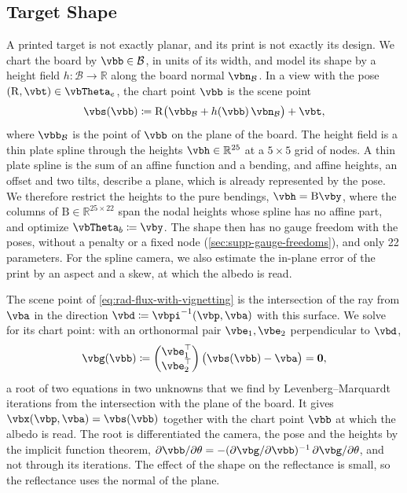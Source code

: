 \subsection{Target Shape}
\label{sec:target-shape}
A printed target is not exactly planar, and its print is not exactly
its design. We chart the board by $\vbb\in\mathcal{B}$, in units of
its width, and model its shape by a height field
$h:\mathcal{B}\rightarrow\mathbb{R}$ along the board normal
$\vbn_{\mathcal{B}}$. In a view with the pose
$(\mathrm{R},\vbt)\in\vbTheta_e$, the chart point $\vbb$ is the scene
point
\begin{equation}
\label{eq:board-surface}
    \vbs(\vbb) \coloneqq \mathrm{R}\bigl(\vbb_{\mathcal{B}} + h(\vbb)\,\vbn_{\mathcal{B}}\bigr) + \vbt,
\end{equation}
where $\vbb_{\mathcal{B}}$ is the point of $\vbb$ on the plane of the
board. The height field is a thin plate spline
\cite{thin-plate-spline} through the heights
$\vbh\in\mathbb{R}^{25}$ at a $5\times5$ grid of nodes. A thin plate
spline is the sum of an affine function and a bending, and affine
heights, an offset and two tilts, describe a plane, which is already
represented by the pose. We therefore restrict the heights to the
pure bendings, $\vbh=\mathrm{B}\vby$, where the columns of
$\mathrm{B}\in\mathbb{R}^{25\times22}$ span the nodal heights whose
spline has no affine part, and optimize $\vbTheta_b\coloneqq\vby$.
The shape then has no gauge freedom with the poses, without a
penalty or a fixed node (\cref{sec:supp-gauge-freedoms}), and only
22 parameters. For the spline camera, we also estimate the in-plane error of the print by
an aspect and a skew, at which the albedo is read.

The scene point of \cref{eq:rad-flux-with-vignetting} is the
intersection of the ray from $\vba$ in the direction
$\vbd\coloneqq\vbpi^{-1}(\vbp,\vba)$ with this surface. We solve for
its chart point: with an orthonormal pair $\vbe_1,\vbe_2$
perpendicular to $\vbd$,
\begin{equation}
\label{eq:board-intersection}
    \vbg(\vbb) \coloneqq
    \begin{pmatrix}\vbe_1^\top\\ \vbe_2^\top\end{pmatrix}
    \bigl(\vbs(\vbb)-\vba\bigr) = \mathbf{0},
\end{equation}
a root of two equations in two unknowns that we find by
Levenberg--Marquardt iterations from the intersection with the plane
of the board. It gives $\vbx(\vbp,\vba)=\vbs(\vbb)$ together with the
chart point $\vbb$ at which the albedo is read. The root is
differentiated \wrt the camera, the pose and the heights by the
implicit function theorem,
$\partial\vbb/\partial\theta=-(\partial\vbg/\partial\vbb)^{-1}\,\partial\vbg/\partial\theta$,
and not through its iterations. The effect of the shape on the
reflectance is small, so the reflectance uses the normal of the
plane.

